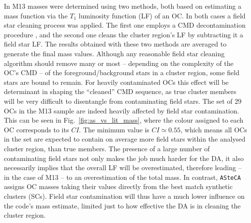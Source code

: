 \documentclass[a4paper,fleqn,usenatbib]{mnras}
\begin{document}
In M13 masses were determined using two methods, both based on estimating
a mass function via the $T_1$ luminosity function (LF) of an OC.\@
In both cases a field star cleaning process was applied. The first one employs
a CMD decontamination procedure \citep[described in][]{Maia_2010}, and the
second one cleans the cluster region's LF by subtracting it a field star LF.\@
The results obtained with these two methods are averaged to generate the final
mass values.
%
Although any reasonable field star cleaning algorithm should remove many or most
-- depending on the complexity of the OC's CMD -- of the foreground/background
stars in a cluster region, some field stars are bound to remain.
For heavily contaminated OCs this effect will be determinant in shaping the
``cleaned'' CMD sequence, as true cluster members will be very difficult to
disentangle from contaminating field stars.
%
The set of 29 OCs in the M13 sample are indeed heavily affected by field star
contamination. This can be seen in Fig.~\ref{fig:as_vs_lit_mass}, where the
colour assigned to each OC corresponds to its $CI$. The minimum value is
$CI{\simeq}0.55$, which means all OCs in the set are expected to contain on 
average more field stars within the analysed cluster region, than true members.
%
The presence of a large number of contaminating field stars not only makes the
job much harder for the DA, it also necessarily implies that the overall LF will
be overestimated, therefore leading -- in the case of M13 --  to an
overestimation of the total mass.
In contrast, \texttt{ASteCA} assigns OC masses taking their values directly from
the best match synthetic clusters (SCs). Field star contamination will thus have
a much lower influence on the code's mass estimate, limited just to how
effective the DA is in cleaning the cluster region.
\end{document}

